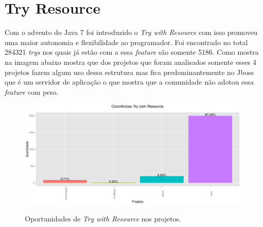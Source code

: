 \section{Try Resource}

Com o advento do Java 7 foi introduzido o \textit{Try with Resource} com isso promoveu uma maior autonomia e flexibilidade ao programador. Foi encontrado no total 284321 \textit{trys} nos quais já estão com a essa \textit{feature} são somente 5186. Como mostra na imagem abaixo mostra que dos projetos que foram analisados somente esses 4 projetos fazem algum uso dessa estrutura mas fica predominantemente no Jboss que é um servidor de aplicação o que mostra que a comunidade não adotou essa \textit{feature} com peso.\\ 


\begin{figure}[h]
	\center
	\includegraphics[scale=0.5]{Imagens/ocorrenciasTryResource}
	\label{fig:Try with Resource}
	\caption{Oportunidades de \textit{Try with Resource} nos projetos.}
\end{figure}
\clearpage